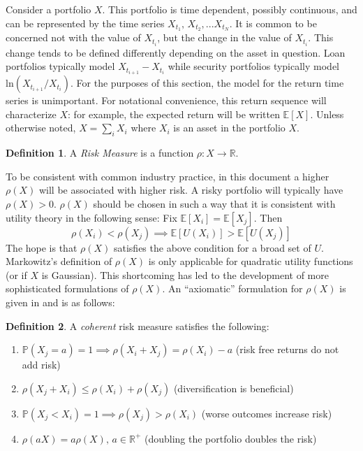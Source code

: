 \documentclass[12pt]{article}
\theoremstyle{definition}
\newtheorem{riskmeasure}{Definition}
\begin{document}
Consider a portfolio \(X\).  This portfolio is time dependent, possibly continuous, and can be represented by the time series \(X_{t_1},\, X_{t_2},...X_{t_N}\).  It is common to be concerned not with the value of \(X_{t_i}\), but the change in the value of \(X_{t_i}\).  This change tends to be defined differently depending on the asset in question.  Loan portfolios typically model \(X_{t_{i+1}}-X_{t_i}\) while security portfolios typically model \(\mathrm{ln}(X_{t_{i+1}}/X_{t_i})\).  For the purposes of this section, the model for the return time series is unimportant. For notational convenience, this return sequence will characterize \(X\): for example, the expected return will be written \(\mathbb{E}[X]\).  Unless otherwise noted, \(X=\sum_i X_i\) where \(X_i\) is an asset in the portfolio \(X\).

\begin{riskmeasure}
A \emph{Risk Measure} is a function \(\rho: X \to \mathbb{R}\).  
\end{riskmeasure}

To be consistent with common industry practice, in this document a higher \(\rho(X)\) will be associated with higher risk.  A risky portfolio will typically have \(\rho(X)>0\).  \(\rho(X)\) should be chosen in such a way that it is consistent with utility theory in the following sense: Fix \(\mathbb{E}[X_i]=\mathbb{E}[X_j]\).  Then
\[\rho(X_i) < \rho(X_j) \implies \mathbb{E}[U(X_i)] > \mathbb{E}[U(X_j)] \]
The hope is that \(\rho(X)\) satisfies the above condition for a broad set of \(U\).  Markowitz's definition of \(\rho(X)\) is only applicable for quadratic utility functions (or if \(X\) is Gaussian).  This shortcoming has led to the development of more sophisticated formulations of \(\rho(X)\).  An ``axiomatic'' formulation for \(\rho(X)\) is given in \cite{artzner1999} and is as follows:

\begin{riskmeasure}
A \emph{coherent} risk measure satisfies the following:
\begin{enumerate}
\item \(\mathbb{P}(X_j=a)=1 \implies \rho(X_i+X_j)=\rho(X_i)-a\) (risk free returns do not add risk) \label{coh1}
\item \(\rho(X_j+X_i) \leq \rho(X_i)+\rho(X_j)\) (diversification is beneficial) \label{coh2}
\item \(\mathbb{P}(X_j<X_i)=1 \implies \rho(X_j) > \rho(X_i)\) (worse outcomes increase risk) \label{coh3}
\item \(\rho(aX)=a\rho(X), \, a \in \mathbb{R} ^+ \) (doubling the portfolio doubles the risk) \label{coh4}

\end{enumerate}
\end{riskmeasure}
\end{document}
